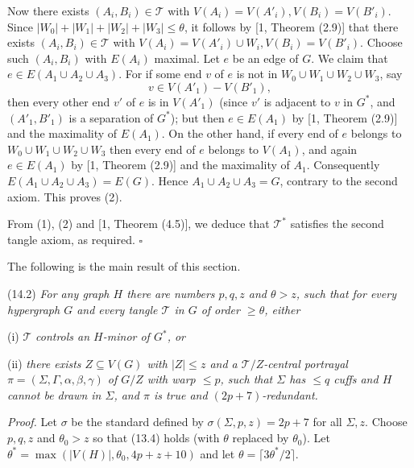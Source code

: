 Now there exists $(A_i, B_i) \in \mathscr{T}$ with $V(A_i) = V(A'_i), V(B_i) = V(B'_i)$. Since $|W_0| + |W_1| + |W_2| + |W_3| \le \theta$, it follows by [1, Theorem (2.9)] that there exists $(A_i, B_i) \in \mathscr{T}$ with $V(A_i) = V(A'_i) \cup W_i, V(B_i) = V(B'_i)$. Choose such $(A_i, B_i)$ with $E(A_i)$ maximal. Let $e$ be an edge of $G$. We claim that $e \in E(A_1 \cup A_2 \cup A_3)$. For if some end $v$ of $e$ is not in $W_0 \cup W_1 \cup W_2 \cup W_3$, say
\begin{equation*}
v \in V(A'_1) - V(B'_1),
\end{equation*}
then every other end $v'$ of $e$ is in $V(A'_1)$ (since $v'$ is adjacent to $v$ in $G^*$, and $(A'_1, B'_1)$ is a separation of $G^*$); but then $e \in E(A_1)$ by [1, Theorem (2.9)] and the maximality of $E(A_1)$. On the other hand, if every end of $e$ belongs to $W_0 \cup W_1 \cup W_2 \cup W_3$ then every end of $e$ belongs to $V(A_1)$, and again $e \in E(A_1)$ by [1, Theorem (2.9)] and the maximality of $A_1$. Consequently $E(A_1 \cup A_2 \cup A_3) = E(G)$. Hence $A_1 \cup A_2 \cup A_3 = G$, contrary to the second axiom. This proves (2).

From (1), (2) and [1, Theorem (4.5)], we deduce that $\mathscr{T}^*$ satisfies the second tangle axiom, as required. $\square$

The following is the main result of this section.

\stmt
(14.2) \textit{For any graph $H$ there are numbers $p, q, z$ and $\theta > z$, such that for every hypergraph $G$ and every tangle $\mathscr{T}$ in $G$ of order $\ge \theta$, either}

\hspace*{12pt}(i) $\mathscr{T}$ \textit{controls an $H$-minor of $G^*$, or}

\hspace*{12pt}(ii) \textit{there exists $Z \subseteq V(G)$ with $|Z| \le z$ and a $\mathscr{T}/Z$-central portrayal $\pi = (\Sigma, \Gamma, \alpha, \beta, \gamma)$ of $G/Z$ with warp $\le p$, such that $\Sigma$ has $\le q$ cuffs and $H$ cannot be drawn in $\Sigma$, and $\pi$ is true and $(2p + 7)$-redundant.}

\textit{Proof.} Let $\sigma$ be the standard defined by $\sigma(\Sigma, p, z) = 2p + 7$ for all $\Sigma, z$. Choose $p, q, z$ and $\theta_0 > z$ so that (13.4) holds (with $\theta$ replaced by $\theta_0$). Let $\theta^* = \max(|V(H)|, \theta_0, 4p + z + 10)$ and let $\theta = \lceil 3\theta^*/2 \rceil$.

